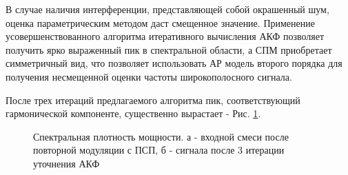 
В случае наличия интерференции, представляющей собой окрашенный шум, оценка параметрическим методом даст смещенное значение.
Применение усовершенствованного алгоритма итеративного вычисления АКФ позволяет получить ярко выраженный пик в спектральной области,
а СПМ приобретает симметричный вид, что позволяет использовать АР модель второго порядка для получения несмещенной оценки частоты
широкополосного сигнала.

После трех итераций предлагаемого алгоритма пик, соответствующий гармонической компоненте, существенно вырастает - Рис. \ref{pic:GPS_spectrum_iter3}.
\begin{figure}[h]
	\center{}
	\caption{Спектральная плотность мощности. а - входной смеси после повторной модуляции с ПСП, б - сигнала после 3 итерации уточнения АКФ}
	\label{pic:GPS_spectrum_iter3}
\end{figure}

